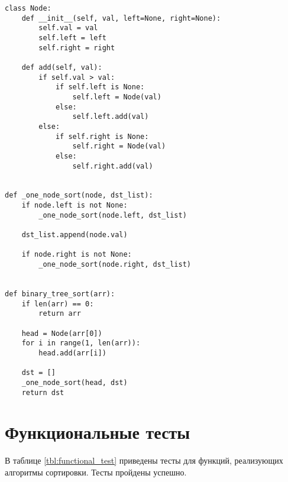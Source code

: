 \begin{lstlisting}[label=lst:beenary,caption=Алгоритм сортировки бинарным деревом поиска]
class Node:
    def __init__(self, val, left=None, right=None):
        self.val = val
        self.left = left
        self.right = right

    def add(self, val):
        if self.val > val:
            if self.left is None:
                self.left = Node(val)
            else:
                self.left.add(val)
        else:
            if self.right is None:
                self.right = Node(val)
            else:
                self.right.add(val)


def _one_node_sort(node, dst_list):
    if node.left is not None:
        _one_node_sort(node.left, dst_list)

    dst_list.append(node.val)

    if node.right is not None:
        _one_node_sort(node.right, dst_list)


def binary_tree_sort(arr):
    if len(arr) == 0:
        return arr

    head = Node(arr[0])
    for i in range(1, len(arr)):
        head.add(arr[i])

    dst = []
    _one_node_sort(head, dst)
    return dst
\end{lstlisting}

\section{Функциональные тесты}

В таблице \ref{tbl:functional_test} приведены тесты для функций, реализующих алгоритмы сортировки. Тесты пройдены успешно.


